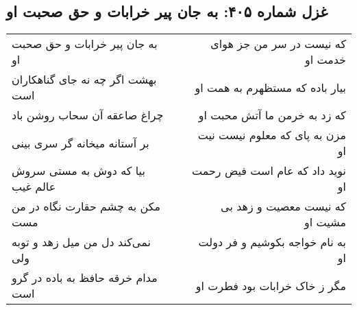 \begin{center}
\section*{غزل شماره ۴۰۵: به جان پیر خرابات و حق صحبت او}
\label{sec:sh405}
\begin{longtable}{l p{0.5cm} r}
به جان پیر خرابات و حق صحبت او
&&
که نیست در سر من جز هوای خدمت او
\\
بهشت اگر چه نه جای گناهکاران است
&&
بیار باده که مستظهرم به همت او
\\
چراغ صاعقه آن سحاب روشن باد
&&
که زد به خرمن ما آتش محبت او
\\
بر آستانه میخانه گر سری بینی
&&
مزن به پای که معلوم نیست نیت او
\\
بیا که دوش به مستی سروش عالم غیب
&&
نوید داد که عام است فیض رحمت او
\\
مکن به چشم حقارت نگاه در من مست
&&
که نیست معصیت و زهد بی مشیت او
\\
نمی‌کند دل من میل زهد و توبه ولی
&&
به نام خواجه بکوشیم و فر دولت او
\\
مدام خرقه حافظ به باده در گرو است
&&
مگر ز خاک خرابات بود فطرت او
\\
\end{longtable}
\end{center}
